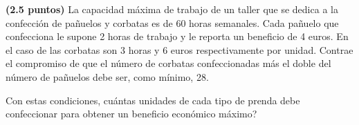 
\textbf{(2.5 puntos)} La capacidad máxima de trabajo de un taller que se dedica a la confección de pañuelos y corbatas es de 60 horas semanales. Cada pañuelo que confecciona le supone 2 horas de trabajo y le reporta un beneficio de 4 euros. En el caso de las corbatas son 3 horas y 6 euros respectivamente por unidad. Contrae el compromiso de que el número de corbatas confeccionadas más el doble del número de pañuelos debe ser, como mínimo, 28.

Con estas condiciones, \textquestiondown{}cuántas unidades de cada tipo de prenda debe confeccionar para obtener un beneficio económico máximo?
